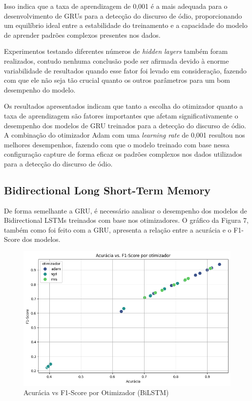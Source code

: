 \documentclass[conference]{IEEEtran}
\begin{document}
Isso indica que a taxa de aprendizagem de 0,001 é a mais adequada para o desenvolvimento de GRUs para a detecção do discurso de ódio, proporcionando um equilíbrio ideal entre a estabilidade do treinamento e a capacidade do modelo de aprender padrões complexos presentes nos dados.

Experimentos testando diferentes números de \textit{hidden layers} também foram realizados, contudo nenhuma conclusão pode ser afirmada devido à enorme variabilidade de resultados quando esse fator foi levado em consideração, fazendo com que ele não seja tão crucial quanto os outros parâmetros para um bom desempenho do modelo.

Os resultados apresentados indicam que tanto a escolha do otimizador quanto a taxa de aprendizagem são fatores importantes que afetam significativamente o desempenho dos modelos de GRU treinados para a detecção do discurso de ódio. A combinação do otimizador Adam com uma \textit{learning rate} de 0,001 resultou nos melhores desempenhos, fazendo com que o modelo treinado com base nessa configuração capture de forma eficaz os padrões complexos nos dados utilizados para a detecção do discurso de ódio.

\subsection{Bidirectional Long Short-Term Memory}

De forma semelhante a GRU, é necessário analisar o desempenho dos modelos de Bidirectional LSTMs treinados com base nos otimizadores. O gráfico da Figura 7, também como foi feito com a GRU, apresenta a relação entre a acurácia e o F1-Score dos modelos.

\begin{figure}[h!]
    \centering
    \includegraphics[width=\linewidth]{images/bilstm-otimizador.png}
    \caption{Acurácia vs F1-Score por Otimizador (BiLSTM)}
    \label{fig:exemplo4}
\end{figure}
\end{document}
